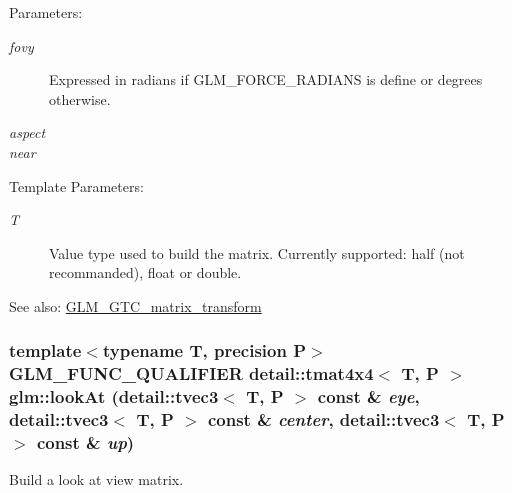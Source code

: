 \begin{Desc}
\item[Parameters:]
\begin{description}
\item[{\em fovy}]Expressed in radians if GLM\_\-FORCE\_\-RADIANS is define or degrees otherwise. \item[{\em aspect}]\item[{\em near}]\end{description}
\end{Desc}
\begin{Desc}
\item[Template Parameters:]
\begin{description}
\item[{\em T}]Value type used to build the matrix. Currently supported: half (not recommanded), float or double. \end{description}
\end{Desc}
\begin{Desc}
\item[See also:]\hyperlink{group__gtc__matrix__transform}{GLM\_\-GTC\_\-matrix\_\-transform} \end{Desc}
\hypertarget{group__gtc__matrix__transform_g7f4f81d4b0d7b492112eb4d5b184d9be}{
\subsubsection[lookAt]{\setlength{\rightskip}{0pt plus 5cm}template$<$typename T, precision P$>$ GLM\_\-FUNC\_\-QUALIFIER detail::tmat4x4$<$ T, P $>$ glm::lookAt (detail::tvec3$<$ T, P $>$ const \& {\em eye}, \/  detail::tvec3$<$ T, P $>$ const \& {\em center}, \/  detail::tvec3$<$ T, P $>$ const \& {\em up})}}
\label{group__gtc__matrix__transform_g7f4f81d4b0d7b492112eb4d5b184d9be}


Build a look at view matrix.

